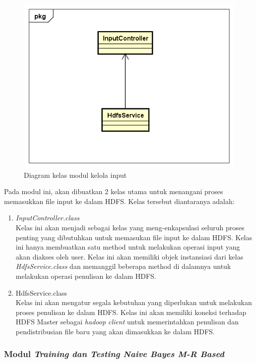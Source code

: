 \begin{figure}[H]
	\centering
	\includegraphics[scale=0.7]{ClassDiagram/Simple_CD_Input}
	\caption[Diagram kelas modul kelola input]{Diagram kelas modul kelola input}
	\label{fig:Diagram kelas modul kelola input}
\end{figure}

Pada modul ini, akan dibuatkan 2 kelas utama untuk menangani proses memasukkan file input ke dalam HDFS. Kelas tersebut diantaranya adalah:
\begin{enumerate}
\item{\textit{InputController.class}} \\
Kelas ini akan menjadi sebagai kelas yang meng-enkapsulasi seluruh proses penting yang dibutuhkan untuk memasukan file input ke dalam HDFS. Kelas ini hanya membuatkan satu method untuk melakukan operasi input yang akan diakses oleh user. Kelas ini akan memiliki objek instansiasi dari kelas \textit{HdfsService.class} dan memanggil beberapa method di dalamnya untuk melakukan operasi penulisan ke dalam HDFS.
\item{HdfsService.class} \\
Kelas ini akan mengatur segala kebutuhan yang diperlukan untuk melakukan proses penulisan ke dalam HDFS. Kelas ini akan memiliki koneksi terhadap HDFS Master sebagai \textit{hadoop client} untuk memerintahkan penulisan dan pendistribusian file baru yang akan dimasukkan ke dalam HDFS.
\end{enumerate}

\subsubsection{Modul \textit{Training dan Testing Naive Bayes M-R Based}}

